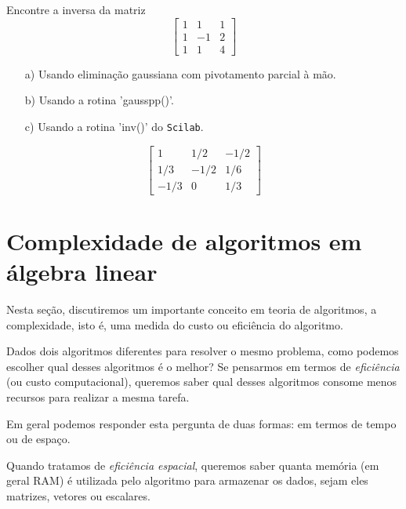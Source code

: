 \ifisscilab
\begin{exer} Encontre a inversa da matriz
\begin{equation}\left[
\begin{array}{ccc}
1&1&1\\
1&-1&2\\
1&1&4
\end{array}\right]\end{equation}
\begin{itemize}
\item[a)] Usando eliminação gaussiana com pivotamento parcial à mão.
\item[b)] Usando a rotina 'gausspp()'.
\item[c)] Usando a rotina 'inv()' do \verb+Scilab+.
\end{itemize}
\end{exer}
\begin{resp}

 \begin{equation} \left[ \begin {array}{ccc} 1&1/2&-1/2\\1/3&-1/2&1/6
\\-1/3&0&1/3\end {array} \right] \end{equation}

\end{resp}
\fi



\section{Complexidade de algoritmos em álgebra linear}
Nesta seção, discutiremos um importante conceito em teoria de algoritmos, a complexidade, isto é, uma medida do custo ou eficiência do algoritmo.

Dados dois algoritmos diferentes para resolver o mesmo problema, como podemos escolher qual desses algoritmos é o melhor? Se pensarmos em termos de \emph{eficiência} (ou custo computacional), queremos saber qual desses algoritmos consome menos recursos para realizar a mesma tarefa.

Em geral podemos responder esta pergunta de duas formas: em termos de tempo ou de espaço.

Quando tratamos de \emph{eficiência espacial}, queremos saber quanta memória (em geral RAM) é utilizada pelo algoritmo para armazenar os dados, sejam eles matrizes, vetores ou escalares.

